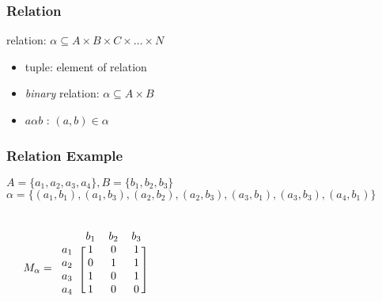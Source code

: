 \documentclass[dvipsnames]{beamer}
\begin{document}
\begin{frame}
  \frametitle{Relation}

  \begin{definition}
    \alert{relation}: $\alpha \subseteq A \times B \times C \times \dots \times N$
  \end{definition}

  \begin{itemize}
    \item \alert{tuple}: element of relation
  \end{itemize}

  \pause
  \medskip
  \begin{itemize}
    \item \emph{binary} relation: $\alpha \subseteq A \times B$
    \item $a \alpha b$ \hspace{1em} : \hspace{1em} $(a,b) \in \alpha$
  \end{itemize}
\end{frame}

\begin{frame}
  \frametitle{Relation Example}

  $A=\{a_1,a_2,a_3,a_4\}, B=\{b_1,b_2,b_3\}$\\
  $\alpha = \{(a_1,b_1),(a_1,b_3),(a_2,b_2),(a_2,b_3),
              (a_3,b_1),(a_3,b_3),(a_4,b_1)\}$

  \pause
  \medskip
  \begin{columns}
    \begin{center}
    \end{center}

    \[
      M_\alpha =
      \begin{blockarray}{cccc}
              & b_1 & b_2 & b_3\\
        \begin{block}{c[ccc]}
          a_1 &  1  &  0  &  1\\
          a_2 &  0  &  1  &  1\\
          a_3 &  1  &  0  &  1\\
          a_4 &  1  &  0  &  0\\
        \end{block}
      \end{blockarray}
    \]
  \end{columns}
\end{frame}
\end{document}

